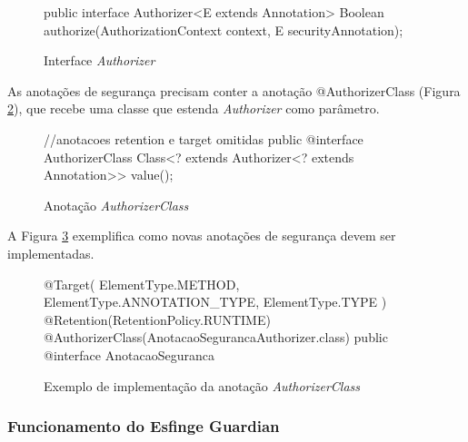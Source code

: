 \begin{figure}[H]
    \centering
    \caption{Interface \textit{Authorizer}}
    \begin{java}
public interface Authorizer<E extends Annotation> {
	Boolean authorize(AuthorizationContext context, E securityAnnotation);
}
    \end{java}
    \label{fig:interface-authorizer}
\end{figure}

\par As anotações de segurança precisam conter a anotação @AuthorizerClass (Figura \ref{fig:anotacao-authorizer-class}), que recebe uma classe que estenda \textit{Authorizer} como parâmetro.

\begin{figure}[H]
    \centering
    \caption{Anotação \textit{AuthorizerClass}}
    \begin{java}
//anotacoes retention e target omitidas
public @interface AuthorizerClass {
	Class<? extends Authorizer<? extends Annotation>> value();
}

    \end{java}
    \label{fig:anotacao-authorizer-class}
\end{figure}

\par A Figura \ref{fig:anotacao-seguranca} exemplifica como novas anotações de segurança devem ser implementadas.

\begin{figure}[H]
    \centering
    \caption{Exemplo de implementação da anotação \textit{AuthorizerClass}}
    \begin{java}
@Target({ ElementType.METHOD, ElementType.ANNOTATION_TYPE, ElementType.TYPE })
@Retention(RetentionPolicy.RUNTIME)
@AuthorizerClass(AnotacaoSegurancaAuthorizer.class) 
public @interface AnotacaoSeguranca { 
}
    \end{java}
    \label{fig:anotacao-seguranca}
\end{figure}

\subsubsection{Funcionamento do Esfinge Guardian}

